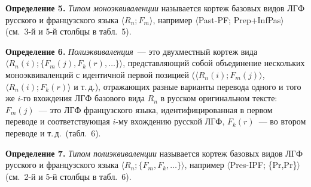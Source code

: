 \begin{multicols}{2}



  \noindent
  \textbf{Определение 5.} \textit{Типом моноэквиваленции} называется кортеж
базовых видов ЛГФ русского и французского языка $\langle R_n; F_m\rangle$,
например $\langle$Past-PF; Prep\;+\;InfPas$\rangle$ (см.\ 3-й и 5-й столбцы в
табл.~5).

  \medskip

  \noindent
  \textbf{Определение 6.} \textit{Полиэквиваленция}~--- это двухместный
кортеж вида $\langle R_n(i); \{F_m(j), F_k (r), \ldots\}\rangle$, представляющий
собой объединение нескольких моноэквиваленций с идентичной первой
позицией ($\langle R_n(i); F_m(j)\rangle$, $\langle R_n(i); F_k(r)\rangle$ и т.\,д.),
отражающих разные варианты перевода одного и того же $i$-го вхождения
ЛГФ базового вида $R_n$ в русском оригинальном тексте: $F_m(j)$~--- это ЛГФ
французского языка, идентифицированная в первом переводе и
соответствующая $i$-му вхождению русской ЛГФ, $F_k(r)$~--- во втором
переводе и т.\,д.\ (табл.~6).

  \medskip

  \noindent
  \textbf{Определение 7.} \textit{Типом полиэквиваленции} называется кортеж
базовых видов ЛГФ русского и французского языка $\langle R_n; \{F_m, F_k,
\ldots\}\rangle$, например $\langle$Pres-IPF; \{Pr,Pr\}$\rangle$ (см.\ 2-й и 5-й столбцы
в  табл.~6).



\begin{table*}\small %
\begin{center}
\vspace*{2ex}


\end{center}
\end{table*}
\end{multicols}
